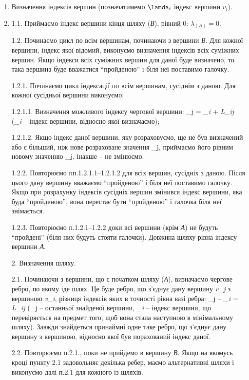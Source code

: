 \begin{enumerate}

\item Визначення індексів вершин (позначатимемо $\lamda_{i}$ індекс вершини $v_{i}$).
\item  1.1. Приймаємо індекс вершини кінця шляху (\emph{В}), рівний 0:
$\lambda_{(B)} = 0$.

1.2. Починаємо цикл по всім вершинам, починаючи з вершини \emph{В}. Для
кожної вершини, індекс якої відомий, виконуємо визначення індексів всіх
суміжних вершин. Якщо індекси всіх суміжних вершин для даної буде
визначено, то така вершина буде вважатися ``пройденою'' і біля неї
поставимо галочку.

1.2.1. Починаємо цикл індексації по всім вершинам, сусіднім з даною. Для
кожної сусідньої вершини виконуємо:

1.2.1.1. Визначення можливого індексу чергової вершини:
\lambda_{j} = \lambda\emph{_{i}} +
\emph{L_{ij}} (\lambda\emph{_{i}} -- індекс вершини,
відносно якої визначаємо);

1.2.1.2. Якщо індекс даної вершини, яку розраховуємо, ще не був
визначений або є більший, ніж нове розраховане значення
\lambda_{j}, приймаємо його рівним новому значенню
\lambda_{j}, інакше -- не змінюємо.

1.2.2. Повторюємо пп.1.2.1.1--1.2.1.2 для всіх вершин, сусідніх з даною.
Після цього дану вершину вважаємо ``пройденою'' і біля неї поставимо
галочку. Якщо при розрахунку індексів сусідніх вершин змінився індекс
вершини, яка буда ``пройденою'', вона перестає бути ``пройденою'' і
галочка біля неї знімається.

1.2.3. Повторюємо п.1.2.1--1.2.2 доки всі вершини (крім \emph{А}) не
будуть ``пройдені'' (біля них будуть стояти галочки). Довжина шляху
рівна індексу вершини \emph{А}.

2. Визначення шляху.

2.1. Починаючи з вершини, що є початком шляху (\emph{А}), визначаємо
чергове ребро, по якому іде шлях. Це буде ребро, що з'єднує дану вершину
\emph{v_{j}} з вершиною \emph{v_{i}}, різниця
індексів яких в точності рівна вазі ребра: \lambda_{j} --
\lambda\emph{_{i}} = \emph{L_{ij}}
(\lambda_{j} -- останньої знайденої вершини,
\lambda\emph{_{i}} -- індекс вершини, що перевіряється на предмет
того, щоб вона стала наступною в мінімальному шляху). Завжди знайдеться
принаймні одне таке ребро, що з'єднує дану вершину з вершиною, відносно
якої був порахований індекс даної.

2.2. Повторюємо п.2.1., поки не прийдемо в вершину \emph{В}. Якщо на
якомусь кроці пункту 2.1 задовольняє декілька ребер, маємо альтернативні
шляхи і виконуємо далі п.2.1 для кожного із шляхів.


\end{enumerate}
